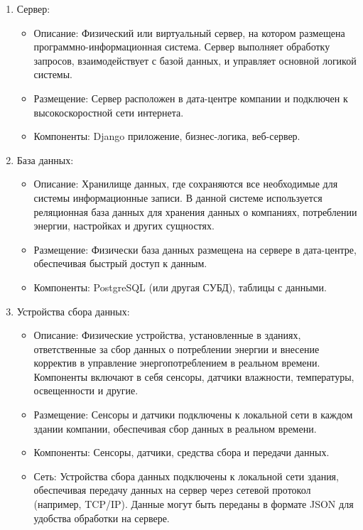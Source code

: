\begin{enumerate}


\item {Сервер:}
\begin{itemize}
	\item {Описание:} Физический или виртуальный сервер, на котором размещена программно-информационная система. Сервер выполняет обработку запросов, взаимодействует с базой данных, и управляет основной логикой системы.
	\item {Размещение:} Сервер расположен в дата-центре компании и подключен к высокоскоростной сети интернета.
	\item {Компоненты:} Django приложение, бизнес-логика, веб-сервер.
\end{itemize}

\item {База данных:}
\begin{itemize}
	\item {Описание:} Хранилище данных, где сохраняются все необходимые для системы информационные записи. В данной системе используется реляционная база данных для хранения данных о компаниях, потреблении энергии, настройках и других сущностях.
	\item {Размещение:} Физически база данных размещена на сервере в дата-центре, обеспечивая быстрый доступ к данным.
	\item {Компоненты:} PostgreSQL (или другая СУБД), таблицы с данными.
\end{itemize}

\item Устройства сбора данных:
\begin{itemize}
\item  {Описание:} Физические устройства, установленные в зданиях, ответственные за сбор данных о потреблении энергии и внесение корректив в управление энергопотреблением в реальном времени. Компоненты включают в себя сенсоры, датчики влажности, температуры, освещенности и другие.
\item  {Размещение:} Сенсоры и датчики подключены к локальной сети в каждом здании компании, обеспечивая сбор данных в реальном времени.
\item  {Компоненты:} Сенсоры, датчики, средства сбора и передачи данных.
\item  {Сеть:} Устройства сбора данных подключены к локальной сети здания, обеспечивая передачу данных на сервер через сетевой протокол (например, TCP/IP). Данные могут быть переданы в формате JSON для удобства обработки на сервере.
\end{itemize}
	

\end{enumerate}
